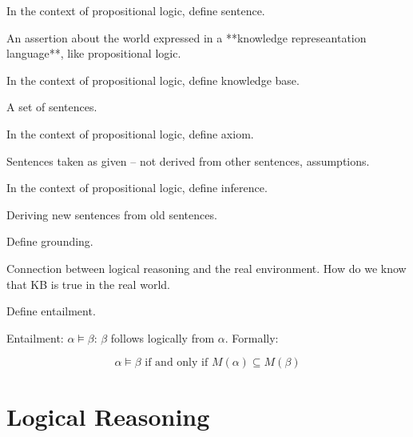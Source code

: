 \begin{questions}

\question In the context of propositional logic, define sentence.

\begin{solution}[.75in]
An assertion about the world expressed in a **knowledge represeantation language**, like propositional logic.
\end{solution}

\question In the context of propositional logic, define knowledge base.

\begin{solution}[.75in]
A set of sentences.
\end{solution}

\question In the context of propositional logic, define axiom.

\begin{solution}[.75in]
Sentences taken as given -- not derived from other sentences, assumptions.
\end{solution}

\question In the context of propositional logic, define inference.

\begin{solution}[.75in]
Deriving new sentences from old sentences.
\end{solution}

\question Define grounding.

\begin{solution}[.75in]
Connection between logical reasoning and the real environment.  How do we know that KB is true in the real world.
\end{solution}

\question Define entailment.

\begin{solution}[1in]
Entailment: $\alpha \models \beta$: $\beta$ follows logically from $\alpha$.  Formally:

$$
\alpha \models \beta \text{ if and only if } M(\alpha) \subseteq M(\beta)
$$

\end{solution}

\end{questions}

\newpage

\section{Logical Reasoning}

